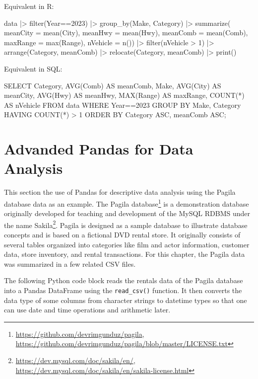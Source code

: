 \begin{multicols}{2}

Equivalent in R:
\begin{Rcode}
data |> 
  filter(Year==2023) |> 
  group_by(Make, Category) |>
  summarize(
       meanCity = mean(City), 
       meanHwy = mean(Hwy),
       meanComb = mean(Comb),
       maxRange = max(Range),
       nVehicle = n()) |>
  filter(nVehicle > 1) |>
  arrange(Category, meanComb) |>
  relocate(Category, meanComb) |>
  print()
\end{Rcode}

Equivalent in SQL:

\begin{sqlcode}
SELECT Category, 
       AVG(Comb) AS meanComb,
       Make,
       AVG(City) AS meanCity,
       AVG(Hwy) AS meanHwy,
       MAX(Range) AS maxRange,
       COUNT(*) AS nVehicle
   FROM data 
   WHERE Year==2023
   GROUP BY Make, Category
   HAVING COUNT(*) > 1
   ORDER BY Category ASC, 
            meanComb ASC;
\end{sqlcode}
\end{multicols}


\section{Advanded Pandas for Data Analysis}

This section the use of Pandas for descriptive data analysis using the Pagila database data as an example. The Pagila database\footnote{\url{https://github.com/devrimgunduz/pagila}, \\
\url{https://github.com/devrimgunduz/pagila/blob/master/LICENSE.txt}} is a demonstration database originally developed for teaching and development of the MySQL RDBMS under the name Sakila\footnote{\url{https://dev.mysql.com/doc/sakila/en/}, \\
\url{https://dev.mysql.com/doc/sakila/en/sakila-license.html}}. Pagila is designed as a sample database to illustrate database concepts and is based on a fictional DVD rental store. It originally consists of several tables organized into categories like film and actor information, customer data, store inventory, and rental transactions. For this chapter, the Pagila data was summarized in a few related CSV files. 

The following Python code block reads the rentals data of the Pagila database into a Pandas DataFrame using the \texttt{read\_csv()} function. It then converts the data type of some columns from character strings to datetime types so that one can use date and time operations and arithmetic later.

